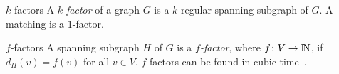 \begin{frame}{$k$-factors}
    \centering
    A \emph{$k$-factor} of a graph $G$ is a $k$-regular spanning subgraph of $G$.
    \bigbreak
    \pause
    A matching is a $1$-factor.
\end{frame}

\begin{frame}{$f$-factors}
    \centering
    A spanning subgraph $H$ of $G$ is a \emph{$f$-factor}, where $f \colon V \to \rm I\!N$, if $d_H(v) = f(v)$ for all $v \in V$.
    \bigbreak
    \pause
    $f$-factors can be found in cubic time~\cite{Ans85}.
\end{frame}

